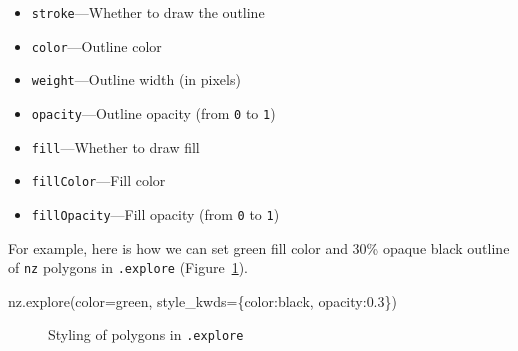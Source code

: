 \documentclass[
  letterpaper,
]{krantz}
\newenvironment{Shaded}{\begin{snugshade}}{\end{snugshade}}
\newcommand{\FloatTok}[1]{\textcolor[rgb]{0.68,0.00,0.00}{#1}}
\newcommand{\NormalTok}[1]{\textcolor[rgb]{0.00,0.23,0.31}{#1}}
\newcommand{\OperatorTok}[1]{\textcolor[rgb]{0.37,0.37,0.37}{#1}}
\newcommand{\StringTok}[1]{\textcolor[rgb]{0.13,0.47,0.30}{#1}}
\providecommand{\tightlist}{%
  \setlength{\itemsep}{0pt}\setlength{\parskip}{0pt}}\usepackage{longtable,booktabs,array}
\begin{document}
\begin{itemize}
\tightlist
\item
  \texttt{stroke}---Whether to draw the outline
\item
  \texttt{color}---Outline color
\item
  \texttt{weight}---Outline width (in pixels)
\item
  \texttt{opacity}---Outline opacity (from \texttt{0} to \texttt{1})
\item
  \texttt{fill}---Whether to draw fill
\item
  \texttt{fillColor}---Fill color
\item
  \texttt{fillOpacity}---Fill opacity (from \texttt{0} to \texttt{1})
\end{itemize}

For example, here is how we can set green fill color and 30\% opaque
black outline of \texttt{nz} polygons in \texttt{.explore}
(Figure~\ref{fig-explore-styling-polygons}).

\begin{Shaded}
\begin{Highlighting}[]
\NormalTok{nz.explore(color}\OperatorTok{=}\StringTok{\textquotesingle{}green\textquotesingle{}}\NormalTok{, style\_kwds}\OperatorTok{=}\NormalTok{\{}\StringTok{\textquotesingle{}color\textquotesingle{}}\NormalTok{:}\StringTok{\textquotesingle{}black\textquotesingle{}}\NormalTok{, }\StringTok{\textquotesingle{}opacity\textquotesingle{}}\NormalTok{:}\FloatTok{0.3}\NormalTok{\})}
\end{Highlighting}
\end{Shaded}

\begin{figure}


\caption{\label{fig-explore-styling-polygons}Styling of polygons in
\texttt{.explore}}

\end{figure}%
\end{document}
